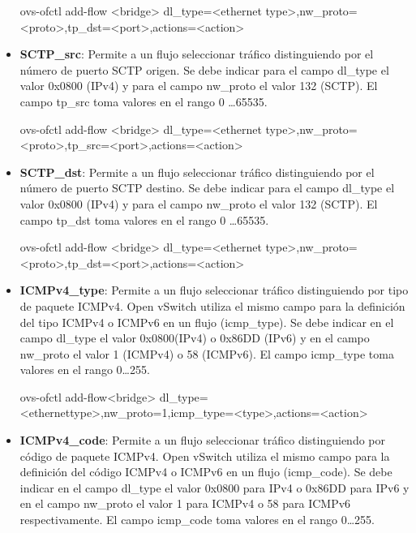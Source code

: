 \begin{itemize}
\begin{center}
ovs-ofctl add-flow <bridge> dl\_type=<ethernet type>,nw\_proto=<proto>,tp\_dst=<port>,actions=<action>
\end{center}

\item \textbf{SCTP\_src}: Permite a un flujo seleccionar tr\'afico distinguiendo por el n\'umero de puerto SCTP origen. Se debe indicar para el campo dl\_type el valor 0x0800 (IPv4) y para el campo nw\_proto el valor 132 (SCTP). El campo tp\_src toma valores en el rango 0 \dots 65535.

\begin{center}
ovs-ofctl add-flow <bridge> dl\_type=<ethernet type>,nw\_proto=<proto>,tp\_src=<port>,actions=<action>
\end{center}

\item \textbf{SCTP\_dst}: Permite a un flujo seleccionar tr\'afico distinguiendo por el n\'umero de puerto SCTP destino. Se debe indicar para el campo dl\_type el valor 0x0800 (IPv4) y para el campo nw\_proto el valor 132 (SCTP). El campo tp\_dst toma valores en el rango 0 \dots 65535.

\begin{center}
ovs-ofctl add-flow <bridge> dl\_type=<ethernet type>,nw\_proto=<proto>,tp\_dst=<port>,actions=<action>
\end{center}

\item \textbf{ICMPv4\_type}: Permite a un flujo seleccionar tr\'afico distinguiendo por tipo de paquete ICMPv4. Open vSwitch utiliza el mismo campo para la definici\'on del tipo ICMPv4 o ICMPv6 en un flujo (icmp\_type). Se debe indicar en el campo dl\_type el valor 0x0800(IPv4) o 0x86DD (IPv6) y en el campo nw\_proto el valor 1 (ICMPv4) o 58 (ICMPv6). El campo icmp\_type toma valores en el rango 0\dots 255.

\begin{center}
ovs-ofctl add-flow<bridge> dl\_type=<ethernettype>,nw\_proto=1,icmp\_type=<type>,actions=<action>
\end{center}

\item \textbf{ICMPv4\_code}: Permite a un flujo seleccionar tr\'afico distinguiendo por código de paquete ICMPv4. Open vSwitch utiliza el mismo campo para la definici\'on del c\'odigo ICMPv4 o ICMPv6 en un flujo (icmp\_code). Se debe indicar en el campo dl\_type el valor 0x0800 para IPv4 o 0x86DD para IPv6 y en el campo nw\_proto el valor 1 para ICMPv4 o 58 para ICMPv6 respectivamente. El campo icmp\_code toma valores en el rango 0\dots 255.


\end{itemize}
